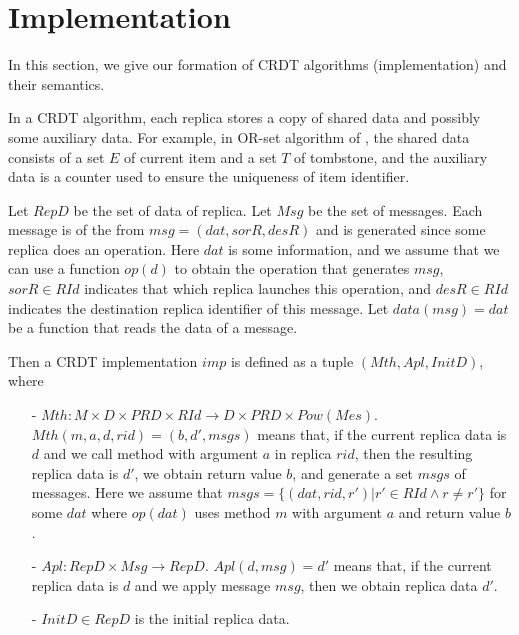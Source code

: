 
\section{Implementation}
\label{sec:implementation}

In this section, we give our formation of CRDT algorithms (implementation) and their semantics.

In a CRDT algorithm, each replica stores a copy of shared data and possibly some auxiliary data. For example, in OR-set algorithm of \cite{Bieniusa:2012}, the shared data consists of a set $E$ of current item and a set $T$ of tombstone, and the auxiliary data is a counter used to ensure the uniqueness of item identifier.

Let $RepD$ be the set of data of replica. Let $Msg$ be the set of messages. Each message is of the from $msg=(dat,sorR,desR)$ and is generated since some replica does an operation. Here $dat$ is some information, and we assume that we can use a function $op(d)$ to obtain the operation that generates $msg$, $sorR \in RId$ indicates that which replica launches this operation, and $desR \in RId$ indicates the destination replica identifier of this message. Let $data(msg)=dat$ be a function that reads the data of a message. 

Then a CRDT implementation $imp$ is defined as a tuple $(Mth,Apl,InitD)$, where

\begin{itemize}
\setlength{\itemsep}{0.5pt}
\item[-] $Mth: M \times D \times PRD \times RId \rightarrow D \times PRD \times Pow(Mes)$. $Mth(m,a,d,rid) = (b,d',msgs)$ means that, if the current replica data is $d$ and we call method with argument $a$ in replica $rid$, then the resulting replica data is $d'$, we obtain return value $b$, and generate a set $msgs$ of messages. Here we assume that $msgs = \{ (dat,rid,r') \vert r' \in RId \wedge r \neq r' \}$ for some $dat$ where $op(dat)$ uses method $m$ with argument $a$ and return value $b$.

\item[-] $Apl: RepD \times Msg \rightarrow RepD$. $Apl(d,msg) = d'$ means that, if the current replica data is $d$ and we apply message $msg$, then we obtain replica data $d'$. 

\item[-] $InitD \in RepD$ is the initial replica data. 
\end{itemize}

